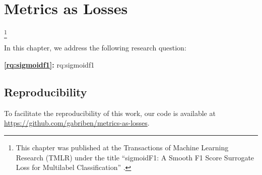
\chapter{Metrics as Losses}
\label{chapter:research-sigmoidf1}

\footnote[]{This chapter was published at the Transactions of Machine Learning Research (TMLR) under the title ``sigmoidF1: A Smooth F1 Score Surrogate Loss for Multilabel Classification'' \citep{sigmoidf1}.}
\acresetall

In this chapter, we address the following research question:

\medskip
\noindent
\textbf{\ref{rq:sigmoidf1}:} \acl{rq:sigmoidf1}
\medskip

\noindent

%
%
%
%
%
%
%
%

\section*{Reproducibility}
To facilitate the reproducibility of this work, our code is available at \url{https://github.com/gabriben/metrics-as-losses}.






